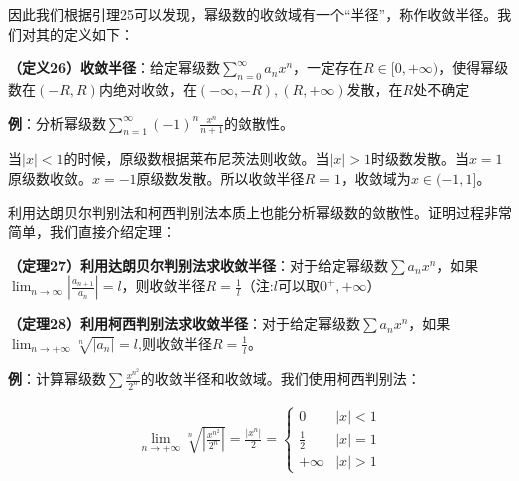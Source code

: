 \documentclass{ctexart}
\let\oldtextbf\textbf
\renewcommand{\textbf}[1]{\textcolor{brown!50!red}{\oldtextbf{#1}}}
\begin{document}
因此我们根据引理25可以发现，幂级数的收敛域有一个“半径”，称作收敛半径。我们对其的定义如下：

\begin{tcolorbox}[
    colback=bac2,     %
    colframe=fra2,   %
    coltitle=white,             %
    coltext=tex2,
    title=圆角框,
    fonttitle=\bfseries,        %
arc=3mm,                     %
breakable
]
\textbf{\color{brown!50!red}（定义26）收敛半径}：给定幂级数$\sum_{n=0}^\infty a_nx^n$，一定存在$R\in[0,+\infty)$，使得幂级数在$(-R,R)$内绝对收敛，在$(-\infty,-R),(R,+\infty)$发散，在$R$处不确定
\end{tcolorbox}

\textbf{\color{brown!50!red}例}：分析幂级数$\sum_{n=1}^\infty (-1)^n \frac{x^n}{n+1}$的敛散性。

当$|x|<1$的时候，原级数根据莱布尼茨法则收敛。当$|x|>1$时级数发散。当$x=1$原级数收敛。$x=-1$原级数发散。所以收敛半径$R=1$，收敛域为$x\in(-1,1]$。

利用达朗贝尔判别法和柯西判别法本质上也能分析幂级数的敛散性。证明过程非常简单，我们直接介绍定理：
\begin{tcolorbox}[
    colback=bac2,     %
    colframe=fra2,   %
    coltitle=white,             %
    coltext=tex2,
    title=圆角框,
    fonttitle=\bfseries,        %
arc=3mm,                     %
breakable
]
\textbf{\color{brown!50!red}（定理27）利用达朗贝尔判别法求收敛半径}：对于给定幂级数$\sum a_n x^n$，如果$\lim_{n\to\infty}|\frac{a_{n+1}}{a_n}|=l$，则收敛半径$R=\frac{1}{l}$（注:$l$可以取$0^+,+\infty$）
\end{tcolorbox}

\begin{tcolorbox}[
    colback=bac2,     %
    colframe=fra2,   %
    coltitle=white,             %
    coltext=tex2,
    title=圆角框,
    fonttitle=\bfseries,        %
arc=3mm,                     %
breakable
]
\textbf{\color{brown!50!red}（定理28）利用柯西判别法求收敛半径}：对于给定幂级数$\sum a_n x^n$，如果$\lim_{n\to+\infty}\sqrt[n]{|a_n|}=l$,则收敛半径$R=\frac{1}{l}$。
\end{tcolorbox}

\textbf{\color{brown!50!red}例}：计算幂级数$\sum \frac{x^{n^2}}{2^n}$的收敛半径和收敛域。我们使用柯西判别法：

\begin{align*}
    \lim_{n\to+\infty}\sqrt[n]{|\frac{x^{n^2}}{2^n} |} =\frac{|x^n|}{2}=\begin{cases}
0 & |x|<1\\
\frac{1}{2}&|x|=1\\
+\infty &|x|>1 
\end{cases} 
\end{align*}
\end{document}
